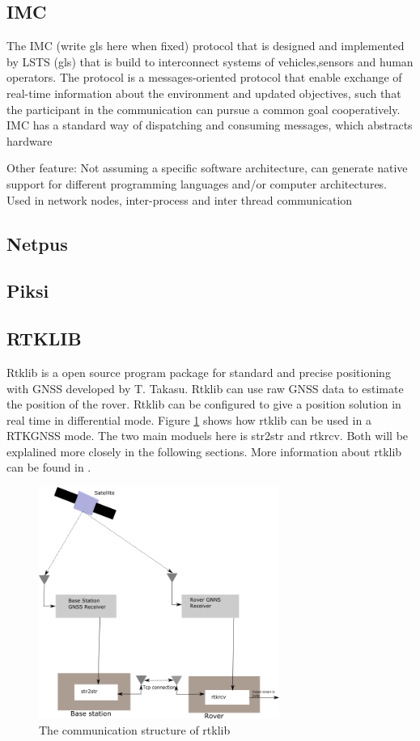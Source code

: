 \subsection{IMC}\label{ss:IMC}
The IMC (write gls here when fixed) protocol that is designed and implemented by LSTS (gls) that is build to interconnect systems of vehicles,sensors and human operators. The protocol is a messages-oriented protocol that enable exchange of real-time information about the environment and updated objectives, such that the participant in the communication can pursue a common goal cooperatively.
IMC has a standard way of dispatching and consuming messages, which abstracts hardware

Other feature: Not assuming a specific software architecture, can generate native support for different programming languages and/or computer architectures. Used in network nodes, inter-process and inter thread communication
\subsection{Netpus}

\subsection{Piksi}\label{ss:Piksi}
\subsection{RTKLIB}\label{ss:Rtklib}
Rtklib is a open source program package for standard and precise positioning with GNSS developed by T. Takasu. Rtklib can use raw GNSS data to estimate the position of the rover. Rtklib can be configured to give a position solution in real time in differential mode. Figure \ref{figure:RTKLIB_STRUCTURE} shows how rtklib can be used in a RTKGNSS mode. The two main moduels here is str2str and rtkrcv. Both will be explalined more closely in the following sections. More information about  rtklib can be found in \citep{Rtklib242}.

\begin{figure}[H]
	\centering
		\includegraphics[width=0.7\textwidth]{figs/Rtklib_structure.png}
		\caption{The communication structure of rtklib}
		\label{figure:RTKLIB_STRUCTURE}
\end{figure}
